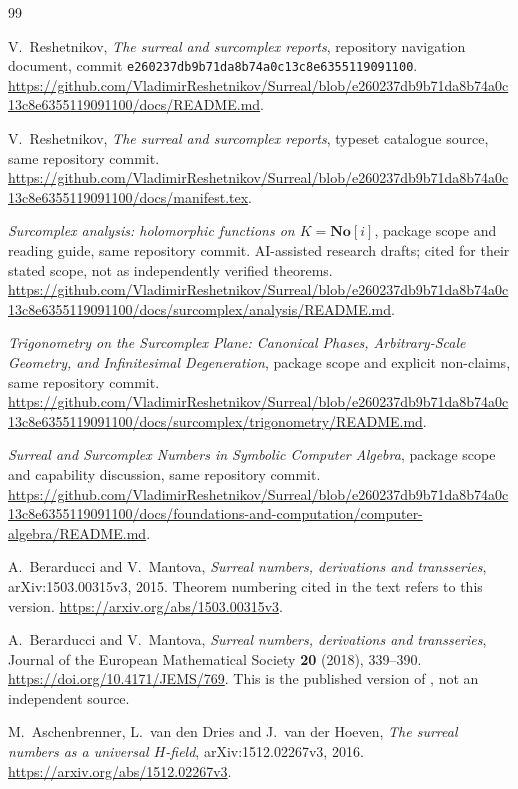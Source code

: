 \documentclass[11pt]{article}
\numberwithin{equation}{section}
\theoremstyle{definition}
\newcommand{\No}{\mathbf{No}}
\begin{document}
\begin{thebibliography}{99}
\raggedright

V.~Reshetnikov, \emph{The surreal and surcomplex reports}, repository
navigation document, commit
\texttt{e260237db9b71da8b74a0c13c8e6355119091100}.
\url{https://github.com/VladimirReshetnikov/Surreal/blob/e260237db9b71da8b74a0c13c8e6355119091100/docs/README.md}.

V.~Reshetnikov, \emph{The surreal and surcomplex reports}, typeset
catalogue source, same repository commit.
\url{https://github.com/VladimirReshetnikov/Surreal/blob/e260237db9b71da8b74a0c13c8e6355119091100/docs/manifest.tex}.

\emph{Surcomplex analysis: holomorphic functions on $K=\No[i]$}, package
scope and reading guide, same repository commit. AI-assisted research
drafts; cited for their stated scope, not as independently verified theorems.
\url{https://github.com/VladimirReshetnikov/Surreal/blob/e260237db9b71da8b74a0c13c8e6355119091100/docs/surcomplex/analysis/README.md}.

\emph{Trigonometry on the Surcomplex Plane: Canonical Phases,
Arbitrary-Scale Geometry, and Infinitesimal Degeneration}, package scope
and explicit non-claims, same repository commit.
\url{https://github.com/VladimirReshetnikov/Surreal/blob/e260237db9b71da8b74a0c13c8e6355119091100/docs/surcomplex/trigonometry/README.md}.

\emph{Surreal and Surcomplex Numbers in Symbolic Computer Algebra},
package scope and capability discussion, same repository commit.
\url{https://github.com/VladimirReshetnikov/Surreal/blob/e260237db9b71da8b74a0c13c8e6355119091100/docs/foundations-and-computation/computer-algebra/README.md}.

A.~Berarducci and V.~Mantova,
\emph{Surreal numbers, derivations and transseries},
arXiv:1503.00315v3, 2015. Theorem numbering cited in the text refers to
this version.
\url{https://arxiv.org/abs/1503.00315v3}.

A.~Berarducci and V.~Mantova,
\emph{Surreal numbers, derivations and transseries},
Journal of the European Mathematical Society \textbf{20} (2018),
339--390.
\url{https://doi.org/10.4171/JEMS/769}.
This is the published version of \cite{BM}, not an independent source.

M.~Aschenbrenner, L.~van den Dries and J.~van der Hoeven,
\emph{The surreal numbers as a universal $H$-field},
arXiv:1512.02267v3, 2016.
\url{https://arxiv.org/abs/1512.02267v3}.


\end{thebibliography}
\end{document}
